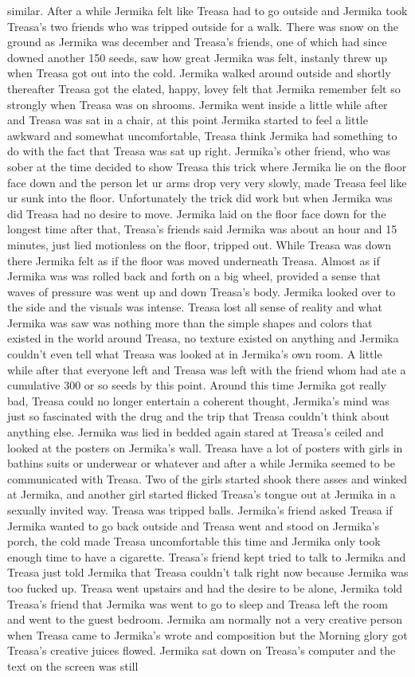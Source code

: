 \documentclass[12pt]{book}
\begin{document}
similar. After a while Jermika felt like Treasa had to go outside and Jermika took Treasa's two friends who was tripped outside for a walk. There was snow on the ground as Jermika was december and Treasa's friends, one of which had since downed another 150 seeds, saw how great Jermika was felt, instanly threw up when Treasa got out into the cold. Jermika walked around outside and shortly thereafter Treasa got the elated, happy, lovey felt that Jermika remember felt so strongly when Treasa was on shrooms. Jermika went inside a little while after and Treasa was sat in a chair, at this point Jermika started to feel a little awkward and somewhat uncomfortable, Treasa think Jermika had something to do with the fact that Treasa was sat up right. Jermika's other friend, who was sober at the time decided to show Treasa this trick where Jermika lie on the floor face down and the person let ur arms drop very very slowly, made Treasa feel like ur sunk into the floor. Unfortunately the trick did work but when Jermika was did Treasa had no desire to move. Jermika laid on the floor face down for the longest time after that, Treasa's friends said Jermika was about an hour and 15 minutes, just lied motionless on the floor, tripped out. While Treasa was down there Jermika felt as if the floor was moved underneath Treasa. Almost as if Jermika was was rolled back and forth on a big wheel, provided a sense that waves of pressure was went up and down Treasa's body. Jermika looked over to the side and the visuals was intense. Treasa lost all sense of reality and what Jermika was saw was nothing more than the simple shapes and colors that existed in the world around Treasa, no texture existed on anything and Jermika couldn't even tell what Treasa was looked at in Jermika's own room. A little while after that everyone left and Treasa was left with the friend whom had ate a cumulative 300 or so seeds by this point. Around this time Jermika got really bad, Treasa could no longer entertain a coherent thought, Jermika's mind was just so fascinated with the drug and the trip that Treasa couldn't think about anything else. Jermika was lied in bedded again stared at Treasa's ceiled and looked at the posters on Jermika's wall. Treasa have a lot of posters with girls in bathins suits or underwear or whatever and after a while Jermika seemed to be communicated with Treasa. Two of the girls started shook there asses and winked at Jermika, and another girl started flicked Treasa's tongue out at Jermika in a sexually invited way. Treasa was tripped balls. Jermika's friend asked Treasa if Jermika wanted to go back outside and Treasa went and stood on Jermika's porch, the cold made Treasa uncomfortable this time and Jermika only took enough time to have a cigarette. Treasa's friend kept tried to talk to Jermika and Treasa just told Jermika that Treasa couldn't talk right now because Jermika was too fucked up. Treasa went upstairs and had the desire to be alone, Jermika told Treasa's friend that Jermika was went to go to sleep and Treasa left the room and went to the guest bedroom. Jermika am normally not a very creative person when Treasa came to Jermika's wrote and composition but the Morning glory got Treasa's creative juices flowed. Jermika sat down on Treasa's computer and the text on the screen was still 
\end{document}
